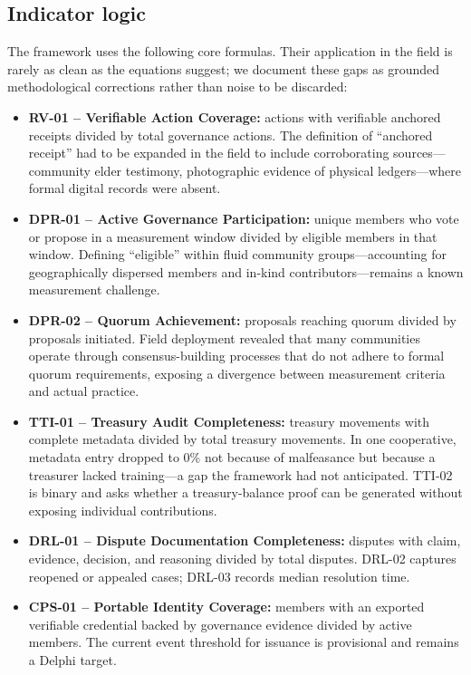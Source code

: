 \documentclass[sigconf,anonymous]{acmart}
\begin{document}
\subsection{Indicator logic}

The framework uses the following core formulas. Their application in the field is rarely as clean as the equations suggest; we document these gaps as grounded methodological corrections rather than noise to be discarded:
\begin{itemize}
\item \textbf{RV-01 -- Verifiable Action Coverage:} actions with verifiable anchored receipts divided by total governance actions. The definition of ``anchored receipt'' had to be expanded in the field to include corroborating sources---community elder testimony, photographic evidence of physical ledgers---where formal digital records were absent.
\item \textbf{DPR-01 -- Active Governance Participation:} unique members who vote or propose in a measurement window divided by eligible members in that window. Defining ``eligible'' within fluid community groups---accounting for geographically dispersed members and in-kind contributors---remains a known measurement challenge.
\item \textbf{DPR-02 -- Quorum Achievement:} proposals reaching quorum divided by proposals initiated. Field deployment revealed that many communities operate through consensus-building processes that do not adhere to formal quorum requirements, exposing a divergence between measurement criteria and actual practice.
\item \textbf{TTI-01 -- Treasury Audit Completeness:} treasury movements with complete metadata divided by total treasury movements. In one cooperative, metadata entry dropped to 0\% not because of malfeasance but because a treasurer lacked training---a gap the framework had not anticipated. TTI-02 is binary and asks whether a treasury-balance proof can be generated without exposing individual contributions.
\item \textbf{DRL-01 -- Dispute Documentation Completeness:} disputes with claim, evidence, decision, and reasoning divided by total disputes. DRL-02 captures reopened or appealed cases; DRL-03 records median resolution time.
\item \textbf{CPS-01 -- Portable Identity Coverage:} members with an exported verifiable credential backed by governance evidence divided by active members. The current event threshold for issuance is provisional and remains a Delphi target.

\end{itemize}
\end{document}
